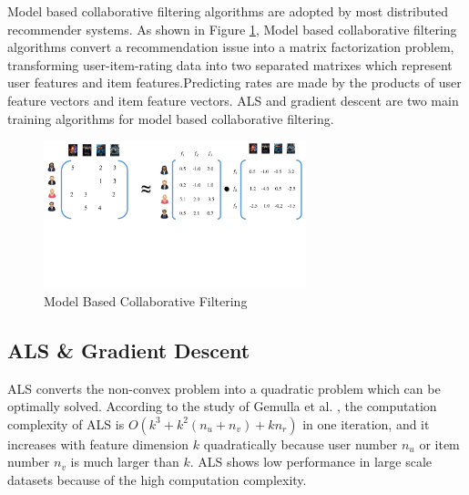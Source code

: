 \documentclass{llncs}
\begin{document}
\label{sec:background}

Model based collaborative filtering algorithms are adopted by most distributed recommender systems. As shown in Figure \ref{fig:MF}, Model based collaborative filtering algorithms convert a recommendation issue into a matrix factorization problem, transforming user-item-rating data into two separated matrixes which represent user features and item features.Predicting rates are made by the products of user feature vectors and item feature vectors.
ALS and gradient descent are two main training algorithms for model based collaborative filtering.
\vspace{-5pt}

\begin{figure}[!htb]
\centering
\includegraphics[width=3in]{pics/MFIntroduction.pdf}
\vspace{-60pt}
\caption{Model Based Collaborative Filtering}
\vspace{-15pt}
\label{fig:MF}
\end{figure}

\subsection{ALS \& Gradient Descent}
\label{sub:gd}

ALS \cite{ALS} converts the non-convex problem into a quadratic problem which can be optimally solved. According to the study of Gemulla et al. \cite{ibm2011}, the computation complexity of ALS is $O(k^3 + k^2(n_u + n_v) + kn_r)$ in one iteration, and it increases with feature dimension $k$ quadratically because user number $n_u$ or item number $n_v$ is much larger than $k$. ALS shows low performance in large scale datasets because of the high computation complexity.
\end{document}

